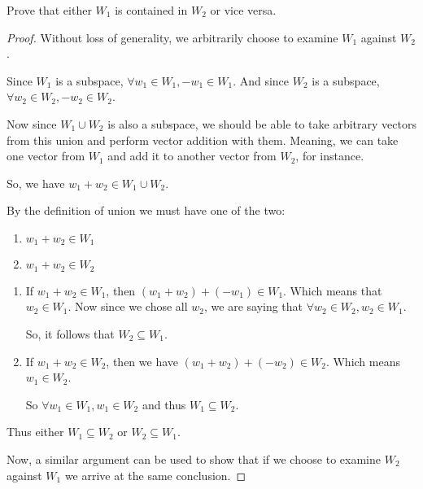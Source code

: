\documentclass[12pt,letterpaper]{article}
\begin{document}
\begin{enumerate}
      Prove that either $W_1$ is contained in $W_2$ or vice versa.

      \begin{proof}
        Without loss of generality, we arbitrarily choose to examine $W_1$ against $W_2$.

        Since $W_1$ is a subspace, $\forall w_1 \in W_1, -w_1 \in W_1$.
        And since $W_2$ is a subspace, $\forall w_2 \in W_2, -w_2 \in W_2$.

        Now since $W_1 \cup W_2$ is also a subspace, we should be able to take arbitrary vectors from this union and perform vector addition with them.
        Meaning, we can take one vector from $W_1$ and add it to another vector from $W_2$, for instance.

        So, we have $w_1 + w_2 \in W_1 \cup W_2$.

        By the definition of union we must have one of the two:
        \begin{enumerate}
          \item $w_1 + w_2 \in W_1$
          \item $w_1 + w_2 \in W_2$
        \end{enumerate}

        \begin{enumerate}
          \item
            If $w_1 + w_2 \in W_1$, then $(w_1 + w_2) + (-w_1) \in W_1$.
            Which means that $w_2 \in W_1$.
            Now since we chose all $w_2$,
            we are saying that $\forall w_2 \in W_2, w_2 \in W_1$.

            So, it follows that $W_2 \subseteq W_1$.

          \item
            If $w_1 + w_2 \in W_2$, then we have $(w_1 + w_2) + (-w_2) \in W_2$.
            Which means $w_1 \in W_2$.

            So $\forall w_1 \in W_1, w_1 \in W_2$ and thus $W_1 \subseteq W_2$.
        \end{enumerate}

        Thus either $W_1 \subseteq W_2$ or $W_2 \subseteq W_1$.

        Now, a similar argument can be used to show that
        if we choose to examine $W_2$ against $W_1$ we arrive at the same conclusion.
      \end{proof}
  \end{enumerate}
\end{document}
